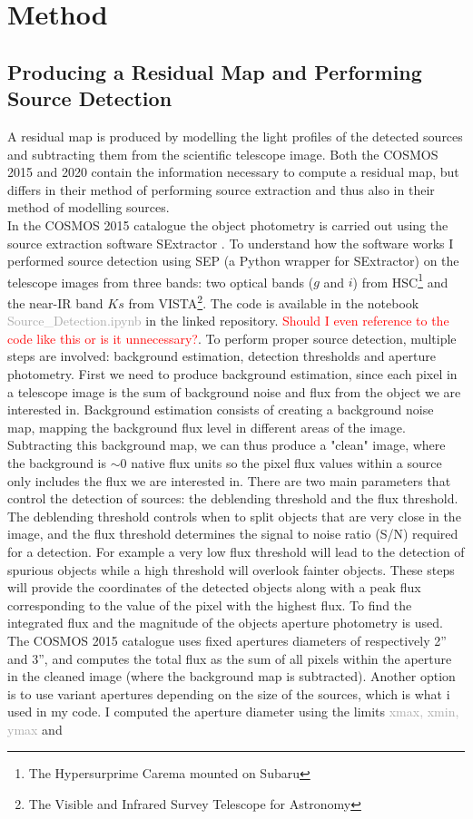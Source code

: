 \section{Method}
\subsection{Producing a Residual Map and Performing Source Detection}
A residual map is produced by modelling the light profiles of the detected sources and subtracting them from the scientific telescope image. Both the COSMOS 2015 and 2020 contain the information necessary to compute a residual map, but differs in their method of performing source extraction and thus also in their method of modelling sources. \\

In the COSMOS 2015 catalogue the object photometry is carried out using the source extraction software SExtractor \cite{SExtractor_1996}. To understand how the software works I performed source detection using SEP \cite{SEP_2018} (a Python wrapper for SExtractor) on the telescope images from three bands: two optical bands ($g$ and $i$) from HSC\footnote{The Hypersurprime Carema mounted on Subaru} and the near-IR band $Ks$ from VISTA\footnote{The Visible and Infrared Survey Telescope for Astronomy}. The code is available in the notebook \textcolor{darkgray}{Source\_Detection.ipynb} in the linked repository. \textcolor{red}{Should I even reference to the code like this or is it unnecessary?}. To perform proper source detection, multiple steps are involved: background estimation, detection thresholds and aperture photometry. First we need to produce background estimation, since each pixel in a telescope image is the sum of background noise and flux from the object we are interested in. Background estimation consists of creating a background noise map, mapping the background flux level in different areas of the image. Subtracting this background map, we can thus produce a "clean" image, where the background is $\sim 0$ native flux units so the pixel flux values within a source only includes the flux we are interested in. There are two main parameters that control the detection of sources: the deblending threshold and the flux threshold. The deblending threshold controls when to split objects that are very close in the image, and the flux threshold determines the signal to noise ratio (S/N) required for a detection. For example a very low flux threshold will lead to the detection of spurious objects while a high threshold will overlook fainter objects. These steps will provide the coordinates of the detected objects along with a peak flux corresponding  to the value of the pixel with the highest flux. To find the integrated flux and the magnitude of the objects aperture photometry is used. The COSMOS 2015 catalogue uses fixed apertures diameters of respectively 2'' and 3'', and computes the total flux as the sum of all pixels within the aperture in the cleaned image (where the background map is subtracted). Another option is to use variant apertures depending on the size of the sources, which is what i used in my code. I computed the aperture diameter using the limits \textcolor{darkgray}{xmax, xmin, ymax} and 